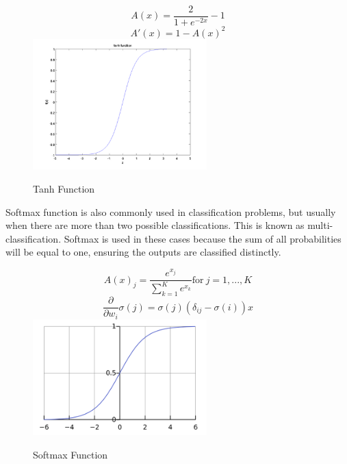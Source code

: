 \begin{figure}[H]
\caption{Tanh Function}
\label{fig:Tanh}
\centering
\begin{equation}
A(x)=\frac{2}{1+e^{-2x}}-1
\end{equation}
\begin{equation}
A'(x)=1-A(x)^{2}
\end{equation}
\includegraphics[width=0.6\textwidth]{Figures/Tanh.png}
\end{figure}

Softmax function is also commonly used in classification problems, but usually when there are more than two possible classifications. This is known as multi-classification\cite{intro_ml}. Softmax is used in these cases because the sum of all probabilities will be equal to one, ensuring the outputs are classified distinctly.

\begin{figure}[H]
\caption{Softmax Function}
\label{fig:Softmax}
\centering
\begin{equation}
    A(x)_j = \displaystyle\frac{e^{x_j}}{\displaystyle\sum_{k=1}^{K} e^{x_k}} \text{for}~j = 1, ... , K
\end{equation}
\begin{equation}
    \frac{\partial}{\partial w_i }\sigma(j)=\sigma(j)\left(\delta _{ij}-\sigma(i) \right )x
\end{equation}
\includegraphics[width=0.6\textwidth]{Figures/Softmax.png}
\end{figure}

